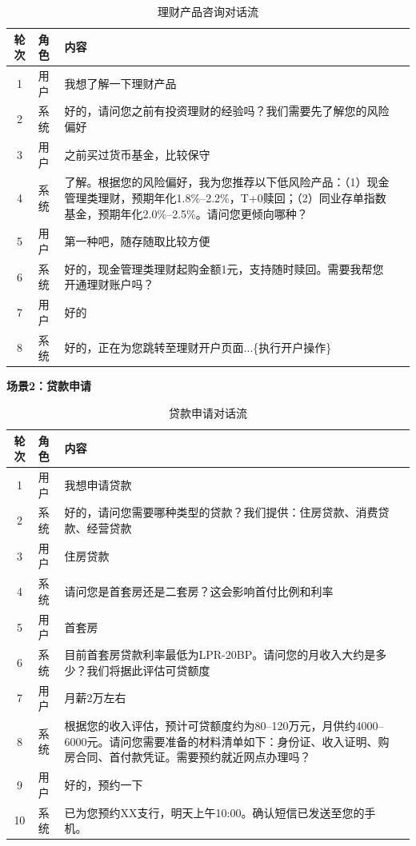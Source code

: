 \begin{table}[H]
\centering
\small
\begin{tabular}{cllp{5.5cm}}
\toprule
\textbf{轮次} & \textbf{角色} & \textbf{内容} \\
\midrule
1 & 用户 & 我想了解一下理财产品 \\
2 & 系统 & 好的，请问您之前有投资理财的经验吗？我们需要先了解您的风险偏好 \\
3 & 用户 & 之前买过货币基金，比较保守 \\
4 & 系统 & 了解。根据您的风险偏好，我为您推荐以下低风险产品：（1）现金管理类理财，预期年化1.8\%--2.2\%，T+0赎回；（2）同业存单指数基金，预期年化2.0\%--2.5\%。请问您更倾向哪种？ \\
5 & 用户 & 第一种吧，随存随取比较方便 \\
6 & 系统 & 好的，现金管理类理财起购金额1元，支持随时赎回。需要我帮您开通理财账户吗？ \\
7 & 用户 & 好的 \\
8 & 系统 & 好的，正在为您跳转至理财开户页面...\{执行开户操作\} \\
\bottomrule
\end{tabular}
\caption{理财产品咨询对话流}
\end{table}

\textbf{场景2：贷款申请}

\begin{table}[H]
\centering
\small
\begin{tabular}{cllp{5cm}}
\toprule
\textbf{轮次} & \textbf{角色} & \textbf{内容} \\
\midrule
1 & 用户 & 我想申请贷款 \\
2 & 系统 & 好的，请问您需要哪种类型的贷款？我们提供：住房贷款、消费贷款、经营贷款 \\
3 & 用户 & 住房贷款 \\
4 & 系统 & 请问您是首套房还是二套房？这会影响首付比例和利率 \\
5 & 用户 & 首套房 \\
6 & 系统 & 目前首套房贷款利率最低为LPR-20BP。请问您的月收入大约是多少？我们将据此评估可贷额度 \\
7 & 用户 & 月薪2万左右 \\
8 & 系统 & 根据您的收入评估，预计可贷额度约为80--120万元，月供约4000--6000元。请问您需要准备的材料清单如下：身份证、收入证明、购房合同、首付款凭证。需要预约就近网点办理吗？ \\
9 & 用户 & 好的，预约一下 \\
10 & 系统 & 已为您预约XX支行，明天上午10:00。确认短信已发送至您的手机。 \\
\bottomrule
\end{tabular}
\caption{贷款申请对话流}
\end{table}

